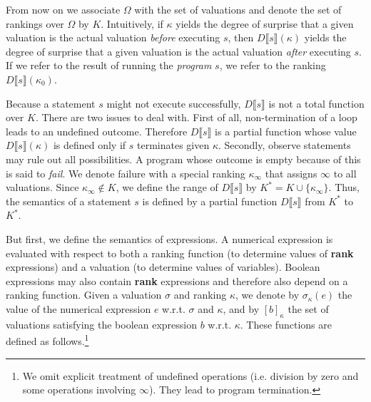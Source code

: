 \documentclass{llncs}
\newcommand{\mods}[2]{[#2]_{#1}}
\newcommand{\dn}[1]{D\llbracket #1 \rrbracket}
\newcommand{\States}{\Omega}
\begin{document}
From now on we associate $\States$ with the set of valuations and denote the set of rankings over $\States$ by $K$.
Intuitively, if %
		$\kappa$ yields the degree of surprise 
	that a given valuation is the actual valuation \emph{before} executing $s$,
	then %
		$\dn{s}(\kappa)$ yields the degree of surprise 
	that a given valuation is the actual valuation \emph{after} executing $s$.
If we refer to the result of running the \emph{program} $s$, we refer to the ranking $\dn{s}(\kappa_0)$.

Because a statement $s$ might not execute successfully, $\dn{s}$ is not a total function over $K$.
There are two issues to deal with.
First of all, non-termination of a loop leads to an undefined outcome.
Therefore $\dn{s}$ is a partial function whose value $\dn{s}(\kappa)$ is defined only if $s$ terminates given $\kappa$.
Secondly, observe statements may rule out all possibilities.
A program whose outcome is empty because of this is said to \emph{fail}.
We denote failure with a special ranking $\kappa_{\infty}$ that assigns $\infty$ to all valuations.
Since $\kappa_{\infty} \not \in K$, we define the range of $\dn{s}$ by $K^{*} = K \cup \{\kappa_{\infty}\}$.
Thus, the semantics of a statement $s$ is defined by a partial function $\dn{s}$ from $K^{*}$ to $K^{*}$.

But first, we define the semantics of expressions.
A numerical expression is evaluated with respect to both a ranking function (to determine values of \textbf{rank} expressions) and a valuation (to determine values of variables).
Boolean expressions may also contain \textbf{rank} expressions and therefore also depend on a ranking function.
Given a valuation $\sigma$ and ranking $\kappa$, we denote by $\sigma_{\kappa}(e)$ the value of the numerical expression $e$ w.r.t. $\sigma$ and $\kappa$,	
	and by $\mods{\kappa}{b}$ the set of valuations satisfying the boolean expression $b$ w.r.t. $\kappa$.
These functions are defined as follows.\footnote{We omit explicit treatment of undefined operations (i.e. division by zero and some operations involving $\infty$). They lead to program termination.}
\end{document}
